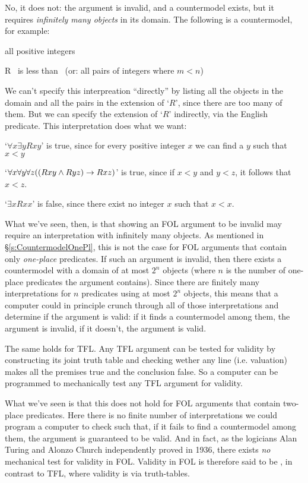 No, it does not: the argument is invalid, and a countermodel exists, but it requires \emph{infinitely many objects} in its domain.  The following is a countermodel, for example:
\begin{ekey}
	\item[\text{Domain}] all positive integers
	\item[R] \blank \ is less than \blank \ (or: all pairs of integers  where $m < n$)
\end{ekey}
We can't specify this interpreation ``directly'' by listing all the objects in the domain and all the pairs in the extension of `$R$', since there are too many of them.  But we can specify the extension of `$R$' indirectly, via the English predicate. This interpretation does what we want:
\begin{ebullet}
\item `$\forall x\exists yRxy$' is true, since for every positive integer $x$ we can find a $y$ such that $x<y$
\item `$\forall x \forall y \forall z((Rxy \wedge Ryz) \rightarrow Rxz)$' is true, since if $x < y$ and $y < z$, it follows that $x < z$.
\item `$\exists xRxx$' is false, since there exist no integer $x$ such that $x < x$.
\end{ebullet}

What we've seen, then, is that showing an FOL argument to be invalid may require an interpretation with infinitely many objects.  As mentioned in \S\ref{s:CountermodelOnePl}, this is not the case for FOL arguments that contain only \emph{one-place} predicates.  If such an argument is invalid, then there exists a countermodel with a domain of at most $2^n$ objects (where $n$ is the number of one-place predicates the argument contains).  Since there are finitely many interpretations for $n$ predicates using at most $2^n$ objects, this means that a computer could in principle crunch through all of those interpretations and determine if the argument is valid: if it finds a countermodel among them, the argument is invalid, if it doesn't, the argument is valid.

The same holds for TFL.  Any TFL argument can be tested for validity by constructing its joint truth table and checking wether any line (i.e. valuation) makes all the premises true and the conclusion false.  So a computer can be programmed to mechanically test any TFL argument for validity.

What we've seen is that this does not hold for FOL arguments that contain two-place predicates.  Here there is no finite number of interpretations we could program a computer to check such that, if it fails to find a countermodel among them, the argument is guaranteed to be valid.  And in fact, as the logicians Alan Turing and Alonzo Church independently proved in 1936, there exists \emph{no} mechanical test for validity in FOL. Validity in FOL is therefore said to be , in contrast to TFL, where validity is  via truth-tables.


